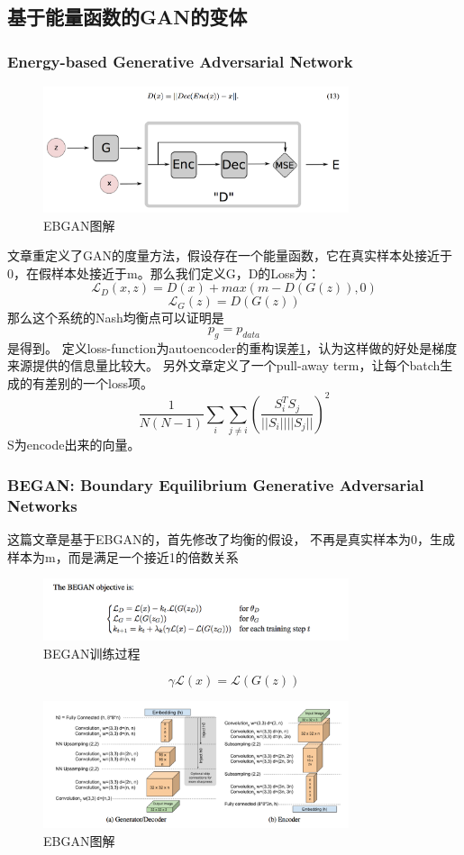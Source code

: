 \documentclass[a4paper]{article}
\begin{document}
\subsection{基于能量函数的GAN的变体}
\subsubsection{Energy-based Generative Adversarial Network\cite{DBLP:journals/corr/ZhaoML16}}
\begin{figure}
\centering
\includegraphics[width=0.8\textwidth]{./img/34.png}
\caption{EBGAN图解}
\label{fig:34}
\end{figure}
文章重定义了GAN的度量方法，假设存在一个能量函数，它在真实样本处接近于0，在假样本处接近于m。那么我们定义G，D的Loss为：
$$\mathcal{L}_D(x,z) = D(x) + max(m - D(G(z)),0)$$
$$\mathcal{L}_G(z) = D(G(z))$$
那么这个系统的Nash均衡点可以证明是$$p_g = p_{data}$$是得到。
定义loss-function为autoencoder的重构误差\ref{fig:34}，认为这样做的好处是梯度来源提供的信息量比较大。
另外文章定义了一个pull-away term，让每个batch生成的有差别的一个loss项。
$$\frac{1}{N(N-1)}\sum\limits_i\sum\limits_{j \neq i}(\frac{S_i^TS_j}{||S_i||||S_j||})^2$$
S为encode出来的向量。
\subsubsection{BEGAN: Boundary Equilibrium Generative Adversarial Networks\cite{DBLP:journals/corr/BerthelotSM17}}
这篇文章是基于EBGAN的，首先修改了均衡的假设， 不再是真实样本为0，生成样本为m，而是满足一个接近1的倍数关系
\begin{figure}
\centering
\includegraphics[width=0.8\textwidth]{./img/35.png}
\caption{BEGAN训练过程}
\label{fig:35}
\end{figure}
$$\gamma \mathcal{L}(x)=\mathcal{L}(G(z))$$
\begin{figure}
\centering
\includegraphics[width=0.8\textwidth]{./img/36.png}
\caption{EBGAN图解}
\label{fig:36}
\end{figure}
\end{document}
